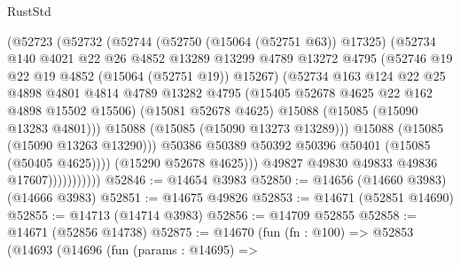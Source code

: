 \begin{lexlean}{RustStd}
\begin{coremodule}
                              (@52723
                                (@52732
                                  (@52744
                                    (@52750 (@15064 (@52751 @63)) @17325)
                                    (@52734
                                      @140
                                      @4021
                                      @22
                                      @26
                                      @4852
                                      @13289
                                      @13299
                                      @4789
                                      @13272
                                      @4795
                                      (@52746 @19 @22 @19 @4852 (@15064 (@52751 @19)) @15267)
                                      (@52734
                                        @163
                                        @124
                                        @22
                                        @25
                                        @4898
                                        @4801
                                        @4814
                                        @4789
                                        @13282
                                        @4795
                                        (@15405 @52678 @4625 @22 @162 @4898 @15502 @15506)
                                        (@15081 @52678 @4625)
                                        @15088
                                        (@15085 (@15090 @13283 @4801)))
                                      @15088
                                      (@15085 (@15090 @13273 @13289)))
                                    @15088
                                    (@15085 (@15090 @13263 @13290)))
                                  @50386
                                  @50389
                                  @50392
                                  @50396
                                  @50401
                                  (@15085 (@50405 @4625))))
                              (@15290 @52678 @4625)))
                          @49827
                          @49830
                          @49833
                          @49836
                          @17607)))))))))))
@52846 := @14654 @3983
@52850 := @14656 (@14660 @3983) (@14666 @3983)
@52851 := @14675 @49826
@52853 := @14671 (@52851 @14690)
@52855 := @14713 (@14714 @3983)
@52856 := @14709 @52855
@52858 := @14671 (@52856 @14738)
@52875 := @14670
    (fun (fn : @100) =>
    @52853
      (@14693
        (@14696
          (fun (params : @14695) =>

\end{coremodule}
\end{lexlean}
